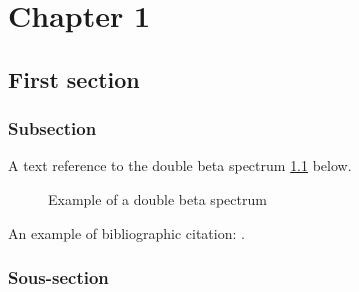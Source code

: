 
\chapter{Chapter 1} \label{chap1:title}
\section{First section}

\subsection{Subsection}

A text reference to the double beta spectrum \ref{chap1:fig:dbd_spectre} below.

\begin{figure}[ht!]
  \centering
  \caption{Example of a double beta spectrum}
  \label{chap1:fig:dbd_spectre}
\end{figure}

\pagebreak
An example of bibliographic citation: \cite{chap1_pauli_letter}.

\subsection{Sous-section}
